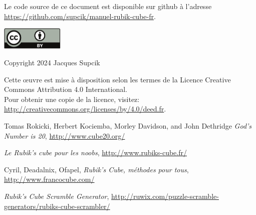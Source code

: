\documentclass[10pt,paper=a5,pagesize]{scrbook}
\begin{document}
\frontmatter
\thispagestyle{empty}

\begin{titlepage}

\end{titlepage}

\thispagestyle{empty}
\null
\vfill

Le code source de ce document est disponible sur github à l'adresse\\
\url{https://github.com/supcik/manuel-rubik-cube-fr}.
\par\vspace*{8mm}

\begin{minipage}[c]{\textwidth}
\begin{versionhistory}
\end{versionhistory}
\end{minipage}
\par\vspace*{10mm}


\includegraphics[width=30mm]{by.pdf}

Copyright \textcopyright{} 2024 Jacques Supcik

Cette œuvre est mise à disposition selon les termes de la Licence Creative Commons Attribution 4.0 International.
\medskip\\
Pour obtenir une copie de la licence, visitez:\\
\url{http://creativecommons.org/licenses/by/4.0/deed.fr}.
\newpage

\tableofcontents

\mainmatter







\backmatter
\begin{thebibliography}{9}
	
	 Tomas Rokicki, Herbert Kociemba, Morley Davidson, and John Dethridge
	\emph{God's Number is 20},
	\url{http://www.cube20.org/}

	\emph{Le Rubik's cube pour les noobs},
	\url{http://www.rubiks-cube.fr/}

	Cyril, Deadalnix, Ofapel,
	\emph{Rubik's Cube, méthodes pour tous},
	\url{http://www.francocube.com/}
	
	\emph{Rubik’s Cube Scramble Generator},
	\url{http://ruwix.com/puzzle-scramble-generators/rubiks-cube-scrambler/}
	
	
\end{thebibliography}
\end{document}
